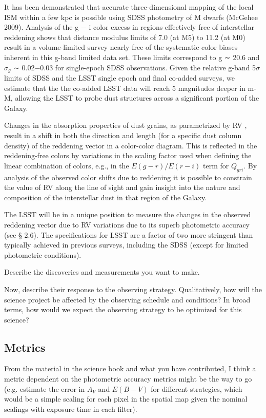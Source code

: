 It has been demonstrated that accurate three-dimensional mapping of the local ISM within a few
kpc is possible using SDSS photometry of M dwarfs (McGehee 2009). Analysis of the g − i color
excess in regions effectively free of interstellar reddening shows that distance modulus limits of 7.0
(at M5) to 11.2 (at M0) result in a volume-limited survey nearly free of the systematic color biases
inherent in this g-band limited data set.
These limits correspond to g ∼ 20.6 and $\sigma_g$ ∼ 0.02−0.03 for single-epoch SDSS observations. Given
the relative g-band 5$\sigma$ limits of SDSS and the LSST single epoch and final co-added surveys, we
estimate that the the co-added LSST data will reach 5 magnitudes deeper in m-M, allowing the
LSST to probe dust structures across a significant portion of the Galaxy. 


Changes in the absorption properties of dust grains, as parametrized by RV , result in a shift in
both the direction and length (for a specific dust column density) of the reddening vector in a
color-color diagram. This is reflected in the reddening-free colors by variations in the scaling factor
used when defining the linear combination of colors, e.g., in the $E(g − r)/E(r − i)$ term for $Q_{gri}$.
By analysis of the observed color shifts due to reddening it is possible to constrain the value of RV
along the line of sight and gain insight into the nature and composition of the interstellar dust in
that region of the Galaxy.

The LSST will be in a unique position to measure the changes in the observed reddening vector
due to RV variations due to its superb photometric accuracy (see § 2.6). The specifications for
LSST are a factor of two more stringent than typically achieved in previous surveys, including the
SDSS (except for limited photometric conditions).


Describe the discoveries and measurements you want to make.

Now, describe their response to the observing strategy. Qualitatively,
how will the science project be affected by the observing schedule and
conditions? In broad terms, how would we expect the observing strategy
to be optimized for this science?



\subsection{Metrics}
\label{sec:\secname:metrics}
 From the material in the science book and what you have contributed, I think a metric dependent on the photometric accuracy metrics might be the way to go (e.g. estimate the error in $A_V$ and $E(B-V)$ for different strategies, which would be a simple scaling for each pixel in the spatial map given the nominal scalings with exposure time in each filter).

